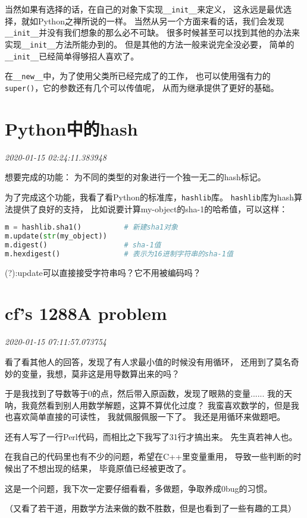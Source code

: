 \documentclass{peterlitsdoc}
\newcommand{\timetx}[1]
    {\par\noindent\emph{\pltgray\small #1}\vspace{2em}}
\newcommand{\vb}{\verb}
\begin{document}
当然如果有选择的话，在自己的对象下实现\vb|__init__|来定义，
这永远是最优选择，就如Python之禅所说的一样。
当然从另一个方面来看的话，我们会发现\vb|__init__|并没有我们想象的那么必不可缺。
很多时候甚至可以找到其他的办法来实现\vb|__init__|方法所能办到的。
但是其他的方法一般来说完全没必要，
简单的\vb|__init__|已经简单得够招人喜欢了。

在\vb|__new__|中，为了使用父类所已经完成了的工作，
也可以使用强有力的\vb|super()|，它的参数还有几个可以传值呢，
从而为继承提供了更好的基础。


\section{Python中的hash}\timetx{2020-01-15 02:24:11.383948}

想要完成的功能：
为不同的类型的对象进行一个独一无二的hash标记。

为了完成这个功能，我看了看Python的标准库，\vb|hashlib|库。
\vb|hashlib|库为hash算法提供了良好的支持，
比如说要计算my-object的sha-1的哈希值，可以这样：

\begin{lstlisting}[language=Python]
m = hashlib.sha1()          # 新建sha1对象
m.update(str(my_object))
m.digest()                  # sha-1值
m.hexdigest()               # 表示为16进制字符串的sha-1值
\end{lstlisting}

(?):update可以直接接受字符串吗？它不用被编码吗？


\section{cf's 1288A problem}\timetx{2020-01-15 07:11:57.073754}

看了看其他人的回答，发现了有人求最小值的时候没有用循环，
还用到了莫名奇妙的变量，我想，莫非这是用导数算出来的吗？

于是我找到了导数等于0的点，然后带入原函数，发现了眼熟的变量......
我的天呐，我竟然看到别人用数学解题，这算不算优化过度？
我蛮喜欢数学的，但是我也喜欢简单直接的可读性，
我就佩服佩服一下了。
我还是用循环来做题吧。

还有人写了一行Perl代码，而相比之下我写了31行才搞出来。
先生真若神人也。

在我自己的代码里也有不少的问题，希望在C++里变量重用，
导致一些判断的时候出了不想出现的结果，
毕竟原值已经被更改了。

这是一个问题，我下次一定要仔细看看，多做题，争取养成0bug的习惯。

（又看了若干道，用数学方法来做的数不胜数，但是也看到了一些有趣的工具）
\end{document}
